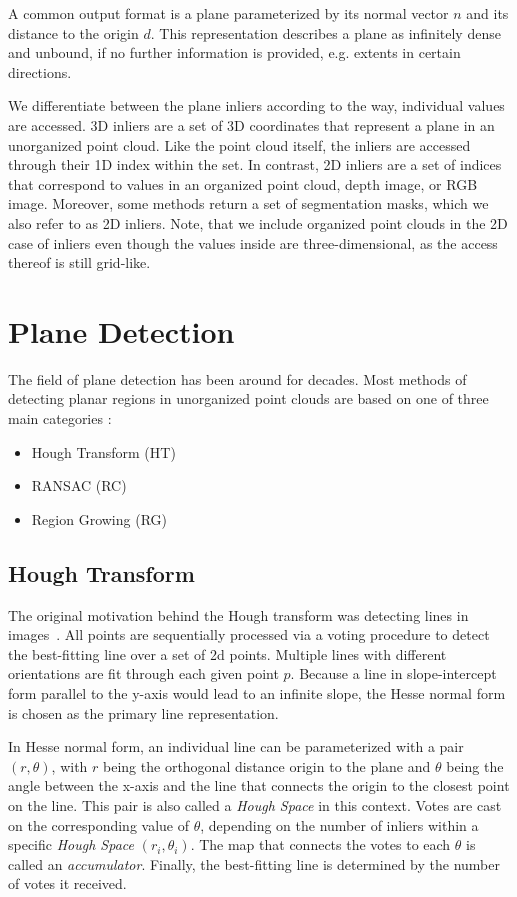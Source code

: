\documentclass[main.tex]{subfiles}
\begin{document}
A common output format is a plane parameterized by its normal vector $n$ and its distance to the origin $d$. This representation
describes a plane as infinitely dense and unbound, if no further information is provided, e.g. extents in certain directions.

We differentiate between the plane inliers according to the way, individual values are accessed.
3D inliers are a set of 3D coordinates that represent a plane in an unorganized point cloud. Like the point cloud itself,
the inliers are accessed through their 1D index within the set.
In contrast, 2D inliers are a set of indices that correspond to values in an organized point cloud, depth image, or RGB image.
Moreover, some methods return a set of segmentation masks, which we also refer to as 2D inliers.
Note, that we include organized point clouds in the 2D case of inliers even though the values inside are three-dimensional,
as the access thereof is still grid-like.

\section{Plane Detection}
The field of plane detection has been around for decades.
Most methods of detecting planar regions in unorganized point clouds are based on one of three main categories \cite{LimbergerOliveira2015HT3D, Araújo_Oliveira_2020}:
\begin{itemize}
    \item Hough Transform (HT)
    \item RANSAC (RC)
    \item Region Growing (RG)
\end{itemize}

\subsection*{Hough Transform}
The original motivation behind the Hough transform was detecting lines in images~\cite{5230799}. All points are sequentially processed via a voting procedure to detect the best-fitting line over a set of 2d points.
Multiple lines with different orientations are fit through each given point $p$.
Because a line in slope-intercept form parallel to the y-axis would lead to an infinite slope, the Hesse normal form is chosen as the primary line representation\cite{10.1145/361237.361242}.

In Hesse normal form, an individual line can be parameterized with a pair $(r, \theta)$, with $r$  being the orthogonal distance origin to the plane and $\theta$ being the angle between the x-axis and the line that connects the origin to the closest point on the line.
This pair is also called a \textit{Hough Space} in this context. Votes are cast on the corresponding value of $\theta$, depending on the number of inliers within a specific \textit{Hough Space} $(r_i,\theta_i)$. The map that connects the
votes to each $\theta$ is called an \textit{accumulator}.
Finally, the best-fitting line is determined by the number of votes it received.
\end{document}
